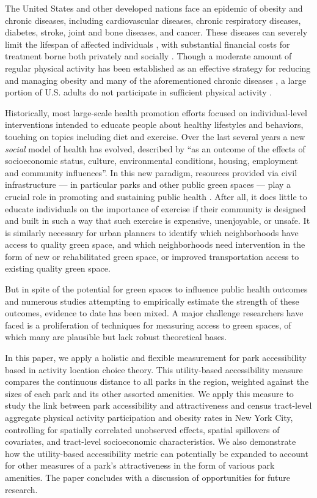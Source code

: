 \documentclass[shortAfour,sageh.bst]{sagej}
\begin{document}
The United States and other developed nations face an epidemic of
obesity and chronic diseases, including cardiovascular diseases, chronic
respiratory diseases, diabetes, stroke, joint and bone diseases, and
cancer. These diseases can severely limit the lifespan of affected
individuals \citep{WHO2014}, with substantial financial costs for
treatment borne both privately and socially \citep{Finkelstein2009}.
Though a moderate amount of regular physical activity has been
established as an effective strategy for reducing and managing obesity
and many of the aforementioned chronic diseases
\citep{CDC2009, Durstine2013}, a large portion of U.S. adults do not
participate in sufficient physical activity \citep{Wolf2008}.

Historically, most large-scale health promotion efforts focused on
individual-level interventions intended to educate people about healthy
lifestyles and behaviors, touching on topics including diet and
exercise. Over the last several years a new \emph{social} model of
health has evolved, described by \citet{Duhl1999} ``as an outcome of the
effects of socioeconomic status, culture, environmental conditions,
housing, employment and community
influences''\citeyearpar[p.7]{Duhl1999}. In this new paradigm, resources
provided via civil infrastructure --- in particular parks and other
public green spaces --- play a crucial role in promoting and sustaining
public health \citep{Bedimo-Rung2005, Wells2007, Coutts2008}. After all,
it does little to educate individuals on the importance of exercise if
their community is designed and built in such a way that such exercise
is expensive, unenjoyable, or unsafe. It is similarly necessary for
urban planners to identify which neighborhoods have access to quality
green space, and which neighborhoods need intervention in the form of
new or rehabilitated green space, or improved transportation access to
existing quality green space.

But in spite of the potential for green spaces to influence public
health outcomes and numerous studies attempting to empirically estimate
the strength of these outcomes, evidence to date has been mixed. A major
challenge researchers have faced is a proliferation of techniques for
measuring access to green spaces, of which many are plausible but lack
robust theoretical bases.

In this paper, we apply a holistic and flexible measurement for park
accessibility based in activity location choice theory. This
utility-based accessibility measure compares the continuous distance to
all parks in the region, weighted against the sizes of each park and its
other assorted amenities. We apply this measure to study the link
between park accessibility and attractiveness and census tract-level
aggregate physical activity participation and obesity rates in New York
City, controlling for spatially correlated unobserved effects, spatial
spillovers of covariates, and tract-level socioeconomic characteristics.
We also demonstrate how the utility-based accessibility metric can
potentially be expanded to account for other measures of a park's
attractiveness in the form of various park amenities. The paper
concludes with a discussion of opportunities for future research.
\end{document}
